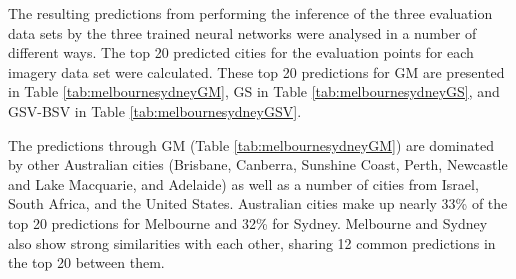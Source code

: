 \documentclass[sageh,times]{sagej}
\begin{document}
The resulting predictions from performing the inference of the three evaluation data sets by the three trained neural networks were analysed in a number of different ways. The top 20 predicted cities for the evaluation points for each imagery data set were calculated. These top 20 predictions for GM are presented in Table \ref{tab:melbournesydneyGM}, GS in Table \ref{tab:melbournesydneyGS}, and GSV-BSV in Table \ref{tab:melbournesydneyGSV}.

The predictions through GM (Table \ref{tab:melbournesydneyGM}) are dominated by other Australian cities (Brisbane, Canberra, Sunshine Coast, Perth, Newcastle and Lake Macquarie, and Adelaide) as well as a number of cities from Israel, South Africa, and the United States. Australian cities make up nearly 33\% of the top 20 predictions for Melbourne and 32\% for Sydney. Melbourne and Sydney also show strong similarities with each other, sharing 12 common predictions in the top 20 between them.
\end{document}
